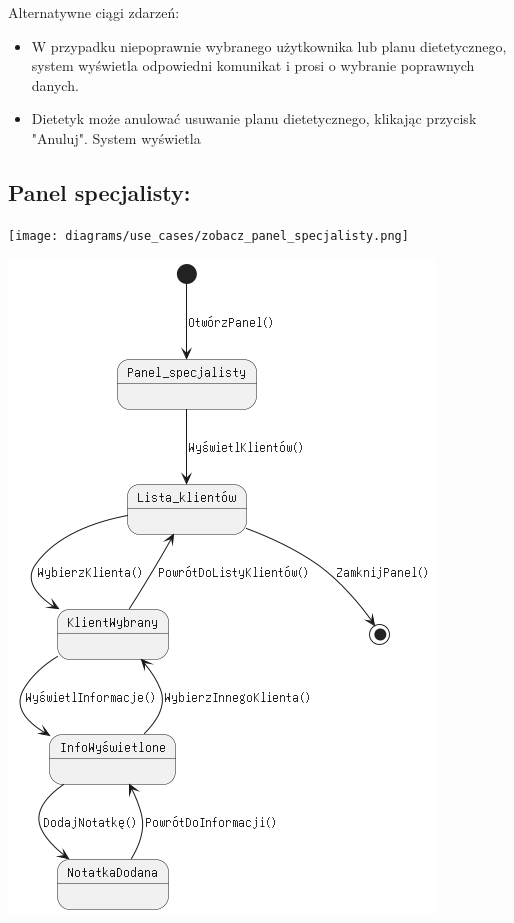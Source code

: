 \documentclass[
]{article}
\providecommand{\tightlist}{%
  \setlength{\itemsep}{0pt}\setlength{\parskip}{0pt}}
\begin{document}
{Alternatywne ciągi zdarzeń:}

\begin{itemize}
\tightlist
\item
  {W przypadku niepoprawnie wybranego użytkownika lub planu
  dietetycznego, system wyświetla odpowiedni komunikat i prosi o
  wybranie poprawnych danych.}
\item
  {Dietetyk może anulować usuwanie planu dietetycznego, klikając
  przycisk "Anuluj". System wyświetla}
\end{itemize}

\hypertarget{h.moo0g2hu8rf}{%
\subsection{\texorpdfstring{{}}{}}\label{h.moo0g2hu8rf}}

\hypertarget{h.8of6ai7v3sbh}{%
\subsection{\texorpdfstring{{Panel
specjalisty:}}{Panel specjalisty:}}\label{h.8of6ai7v3sbh}}

{\texttt{[image: diagrams/use\_cases/zobacz\_panel\_specjalisty.png]}}

{\includegraphics{diagrams/state/panel_specjalisty.png}}
\end{document}
